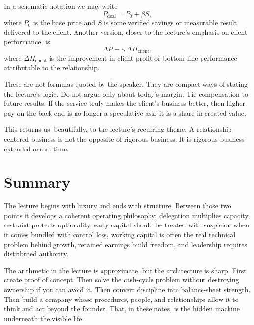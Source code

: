 In a schematic notation we may write
\begin{equation}
P_{\mathrm{deal}} = P_0 + \beta S,
\end{equation}
where \(P_0\) is the base price and \(S\) is some verified savings or measurable result delivered to the client. Another version, closer to the lecture's emphasis on client performance, is
\begin{equation}
\Delta P = \gamma\,\Delta \Pi_{\mathrm{client}},
\end{equation}
where \(\Delta \Pi_{\mathrm{client}}\) is the improvement in client profit or bottom-line performance attributable to the relationship.

These are not formulas quoted by the speaker. They are compact ways of stating the lecture's logic. Do not argue only about today's margin. Tie compensation to future results. If the service truly makes the client's business better, then higher pay on the back end is no longer a speculative ask; it is a share in created value.

This returns us, beautifully, to the lecture's recurring theme. A relationship-centered business is not the opposite of rigorous business. It is rigorous business extended across time.

\section{Summary}

The lecture begins with luxury and ends with structure. Between those two points it develops a coherent operating philosophy: delegation multiplies capacity, restraint protects optionality, early capital should be treated with suspicion when it comes bundled with control loss, working capital is often the real technical problem behind growth, retained earnings build freedom, and leadership requires distributed authority.

The arithmetic in the lecture is approximate, but the architecture is sharp. First create proof of concept. Then solve the cash-cycle problem without destroying ownership if you can avoid it. Then convert discipline into balance-sheet strength. Then build a company whose procedures, people, and relationships allow it to think and act beyond the founder. That, in these notes, is the hidden machine underneath the visible life.